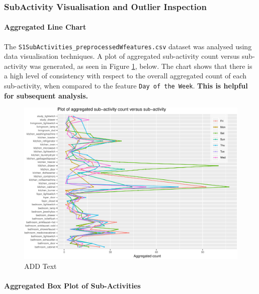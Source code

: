 \documentclass[11pt,]{article}
\let\oldparagraph\paragraph
\renewcommand{\paragraph}[1]{\oldparagraph{#1}\mbox{}}
\begin{document}

\hypertarget{subactivity-visualisation-and-outlier-inspection}{%
\subsubsection{SubActivity Visualisation and Outlier
Inspection}\label{subactivity-visualisation-and-outlier-inspection}}

\hypertarget{aggregated-line-chart}{%
\paragraph{Aggregated Line Chart}\label{aggregated-line-chart}}

The \texttt{S1SubActivities\_preprocessedWfeatures.csv} dataset was
analysed using data visualisation techniques. A plot of aggregated
sub-activity count versus sub-activity was generated, as seen in Figure
\ref{fig:FIG_aggLineChart}, below. The chart shows that there is a high
level of consistency with respect to the overall aggregated count of
each sub-activity, when compared to the feature
\texttt{Day\ of\ the\ Week}. \textbf{This is helpful for subsequent
analysis.}

\begin{figure}[H]

{\centering \includegraphics{MD_Final_files/figure-latex/FIG_aggLineChart-1} 

}

\caption{ADD Text}\label{fig:FIG_aggLineChart}
\end{figure}

\hypertarget{aggregated-box-plot-of-sub-activities}{%
\paragraph{Aggregated Box Plot of
Sub-Activities}\label{aggregated-box-plot-of-sub-activities}}
\end{document}
